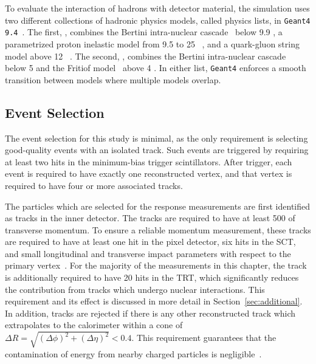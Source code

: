 To evaluate the interaction of hadrons with detector material, the simulation uses two different collections of hadronic physics models, called physics lists, in \texttt{Geant4 9.4}~\cite{G4hadronics}.
The first, \QGSP, combines the Bertini intra-nuclear cascade~\cite{BERT21,BERT22,BERT23} below 9.9 \GeV, a parametrized proton inelastic model from 9.5 to 25 \GeV~\cite{GHEISHA20}, and a quark-gluon string model above 12 \GeV~\cite{QGS15,QGS16,QGS17,QGS18,QGS19}. 
The second, \FTFP, combines the Bertini intra-nuclear cascade~\cite{BERT21,BERT22,BERT23} below 5 \GeV and the Fritiof model~\cite{FTF24,FTF25,FTF26,FTF27} above 4 \GeV.
In either list, \texttt{Geant4} enforces a smooth transition between models where multiple models overlap.

\subsection{Event Selection}
\label{sec:inclusive_selection}
The event selection for this study is minimal, as the only requirement is selecting good-quality events with an isolated track. 
Such events are triggered by requiring at least two hits in the minimum-bias trigger scintillators. 
After trigger, each event is required to have exactly one reconstructed vertex, and that vertex is required to have four or more associated tracks.

The particles which are selected for the response measurements are first identified as tracks in the inner detector.
The tracks are required to have at least 500 \MeV of transverse momentum.
To ensure a reliable momentum measurement, these tracks are required to have at least one hit in the pixel detector, six hits in the SCT, and small longitudinal and transverse impact parameters with respect to the primary vertex~\cite{PERF-2011-05}.
For the majority of the measurements in this chapter, the track is additionally required to have 20 hits in the \ac{TRT}, which significantly reduces the contribution from tracks which undergo nuclear interactions.
This requirement and its effect is discussed in more detail in Section~\ref{sec:additional}. 
In addition, tracks are rejected if there is any other reconstructed track which extrapolates to the calorimeter within a cone of $\Delta R = \sqrt{(\Delta\phi)^2 + (\Delta\eta)^2} < 0.4$.
This requirement guarantees that the contamination of energy from nearby charged particles is negligible~\cite{PERF-2011-05}.


